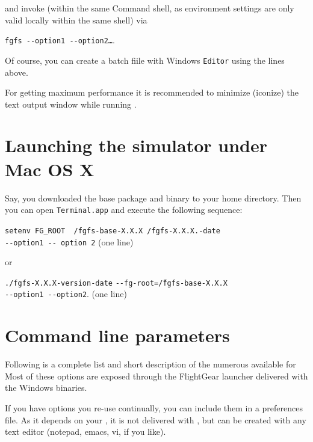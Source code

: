 \noindent
 and invoke \FlightGear{} (within the same Command shell, as environment
 settings are only valid locally within the same shell) via
  \medskip

\texttt{fgfs -$ $-option1 -$ $-option2\dots}.
 \medskip

Of course, you can create a batch fiile with Windows \texttt{Editor} using the
lines above.

For getting maximum performance it is recommended to minimize (iconize) the text output
window while running \FlightGear{}.

\section{Launching the simulator under Mac OS X}
Say, you downloaded the base package and binary to your home directory. Then you can open \texttt{Terminal.app} and execute the following sequence:
\medskip

\noindent
\texttt{setenv FG\_ROOT ~/fgfs-base-X.X.X \./fgfs-X.X.X.-date}\\
\texttt{-$ $-option1 -$ $- option 2} (one line)
\medskip

\noindent
or
\medskip

\noindent
\texttt{./fgfs-X.X.X-version-date}
 \texttt{-$ $-fg-root=\~/fgfs-base-X.X.X}\\
 \texttt{-$ $-option1 -$ $-option2}. (one line)

\section{Command line parameters\label{options}}
Following is a complete list and short description of the numerous 
available for \FlightGear{}\. Most of these options are exposed through the FlightGear launcher delivered with the
Windows binaries.

If you have options you re-use continually, you can include them in a preferences file. As it depends on your
, it is not delivered with \FlightGear{}, but can be created with any text editor (notepad, emacs, vi, if you like). 

